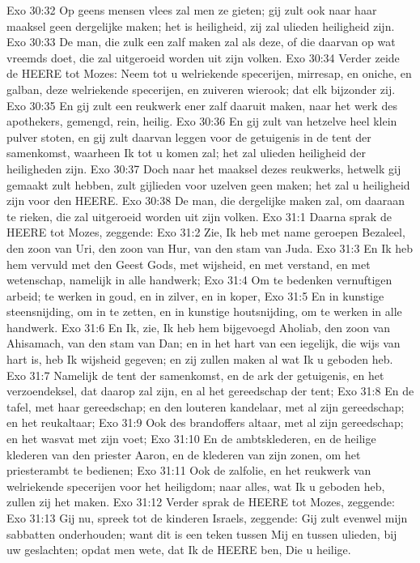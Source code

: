 Exo 30:32  Op geens mensen vlees zal men ze gieten; gij zult ook naar haar maaksel geen dergelijke maken; het is heiligheid, zij zal ulieden heiligheid zijn.
Exo 30:33  De man, die zulk een zalf maken zal als deze, of die daarvan op wat vreemds doet, die zal uitgeroeid worden uit zijn volken.
Exo 30:34  Verder zeide de HEERE tot Mozes: Neem tot u welriekende specerijen, mirresap, en oniche, en galban, deze welriekende specerijen, en zuiveren wierook; dat elk bijzonder zij.
Exo 30:35  En gij zult een reukwerk ener zalf daaruit maken, naar het werk des apothekers, gemengd, rein, heilig.
Exo 30:36  En gij zult van hetzelve heel klein pulver stoten, en gij zult daarvan leggen voor de getuigenis in de tent der samenkomst, waarheen Ik tot u komen zal; het zal ulieden heiligheid der heiligheden zijn.
Exo 30:37  Doch naar het maaksel dezes reukwerks, hetwelk gij gemaakt zult hebben, zult gijlieden voor uzelven geen maken; het zal u heiligheid zijn voor den HEERE.
Exo 30:38  De man, die dergelijke maken zal, om daaraan te rieken, die zal uitgeroeid worden uit zijn volken.
Exo 31:1  Daarna sprak de HEERE tot Mozes, zeggende:
Exo 31:2  Zie, Ik heb met name geroepen Bezaleel, den zoon van Uri, den zoon van Hur, van den stam van Juda.
Exo 31:3  En Ik heb hem vervuld met den Geest Gods, met wijsheid, en met verstand, en met wetenschap, namelijk in alle handwerk;
Exo 31:4  Om te bedenken vernuftigen arbeid; te werken in goud, en in zilver, en in koper,
Exo 31:5  En in kunstige steensnijding, om in te zetten, en in kunstige houtsnijding, om te werken in alle handwerk.
Exo 31:6  En Ik, zie, Ik heb hem bijgevoegd Aholiab, den zoon van Ahisamach, van den stam van Dan; en in het hart van een iegelijk, die wijs van hart is, heb Ik wijsheid gegeven; en zij zullen maken al wat Ik u geboden heb.
Exo 31:7  Namelijk de tent der samenkomst, en de ark der getuigenis, en het verzoendeksel, dat daarop zal zijn, en al het gereedschap der tent;
Exo 31:8  En de tafel, met haar gereedschap; en den louteren kandelaar, met al zijn gereedschap; en het reukaltaar;
Exo 31:9  Ook des brandoffers altaar, met al zijn gereedschap; en het wasvat met zijn voet;
Exo 31:10  En de ambtsklederen, en de heilige klederen van den priester Aaron, en de klederen van zijn zonen, om het priesterambt te bedienen;
Exo 31:11  Ook de zalfolie, en het reukwerk van welriekende specerijen voor het heiligdom; naar alles, wat Ik u geboden heb, zullen zij het maken.
Exo 31:12  Verder sprak de HEERE tot Mozes, zeggende:
Exo 31:13  Gij nu, spreek tot de kinderen Israels, zeggende: Gij zult evenwel mijn sabbatten onderhouden; want dit is een teken tussen Mij en tussen ulieden, bij uw geslachten; opdat men wete, dat Ik de HEERE ben, Die u heilige.
